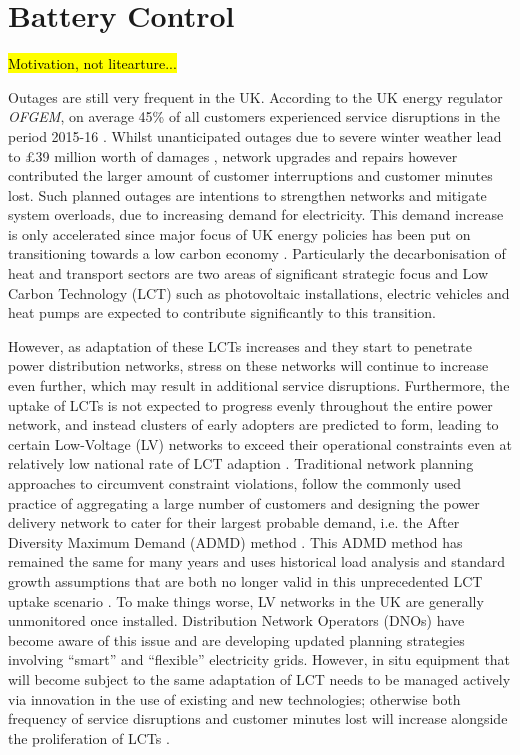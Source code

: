 \section{Battery Control}
\label{ch-review:sec:battery-control}

\hl{Motivation, not litearture...}

Outages are still very frequent in the UK. 
According to the UK energy regulator \textit{OFGEM}, on average 45\% of all customers experienced service disruptions in the period 2015-16 \cite{Ofgem2017}.
Whilst unanticipated outages due to severe winter weather lead to \pounds39 million worth of damages \cite{Ofgem2014}, network upgrades and repairs however contributed the larger amount of customer interruptions and customer minutes lost.
Such planned outages are intentions to strengthen networks and mitigate system overloads, due to increasing demand for electricity.
This demand increase is only accelerated since major focus of UK energy policies has been put on transitioning towards a low carbon economy \cite{HMGovernment2009, RoyalAcademyofEngineering2010}.
Particularly the decarbonisation of heat and transport sectors are two areas of significant strategic focus and Low Carbon Technology (LCT) such as photovoltaic installations, electric vehicles and heat pumps are expected to contribute significantly to this transition.

However, as adaptation of these LCTs increases and they start to penetrate power distribution networks, stress on these networks will continue to increase even further, which may result in additional service disruptions.
Furthermore, the uptake of LCTs is not expected to progress evenly throughout the entire power network, and instead clusters of early adopters are predicted to form, leading to certain Low-Voltage (LV) networks to exceed their operational constraints even at relatively low national rate of LCT adaption \cite{Poghosyan2014}.
Traditional network planning approaches to circumvent constraint violations, follow the commonly used practice of aggregating a large number of customers and designing the power delivery network to cater for their largest probable demand, i.e. the After Diversity Maximum Demand (ADMD) method \cite{Richardson2010a}.
This ADMD method has remained the same for many years and uses historical load analysis and standard growth assumptions that are both no longer valid in this unprecedented LCT uptake scenario \cite{Yunusov2016}.
To make things worse, LV networks in the UK are generally unmonitored once installed.
Distribution Network Operators (DNOs) have become aware of this issue and are developing updated planning strategies involving ``smart'' and ``flexible'' electricity grids.
However, in situ equipment that will become subject to the same adaptation of LCT needs to be managed actively via innovation in the use of existing and new technologies; otherwise both frequency of service disruptions and customer minutes lost will increase alongside the proliferation of LCTs \cite{Ault2008a}.

